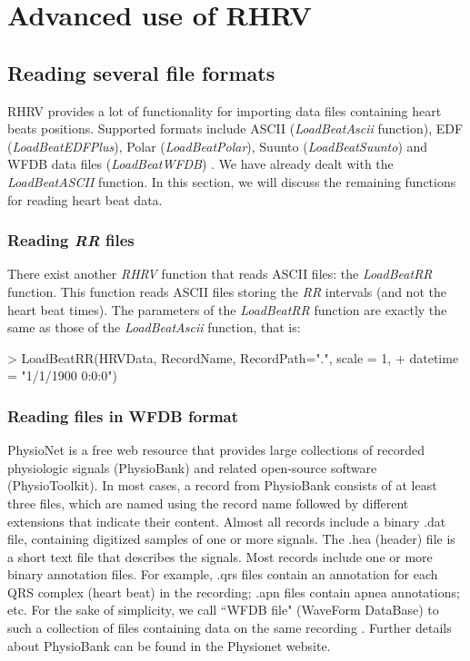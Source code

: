 \documentclass[12pt,lot, lof]{puthesis}
\begin{document}

\chapter{Advanced use of  RHRV\label{ch:RHRV}}

\section{Reading several file formats\label{sec:fileFormats}}
 RHRV provides a lot of functionality for importing data files containing heart 
beats positions. Supported formats include ASCII (\textit{LoadBeatAscii} 
function), EDF (\textit{LoadBeatEDFPlus}), Polar (\textit{LoadBeatPolar}), 
Suunto (\textit{LoadBeatSuunto}) and WFDB data files (\textit{LoadBeatWFDB}) 
\cite{mitbih}. We have already dealt with the \textit{LoadBeatASCII} function. 
In this section, we will discuss the remaining functions for reading heart beat 
data.

\subsection{Reading \textit{RR} files} There exist another \textit{RHRV} 
function that reads ASCII files:  the \textit{LoadBeatRR} function. This 
function reads ASCII files storing the \textit{RR} intervals (and not the heart 
beat times). The parameters of the \textit{LoadBeatRR} function are exactly the 
same as those of the \textit{LoadBeatAscii} function, that is:
\begin{Schunk}
\begin{Sinput}
> LoadBeatRR(HRVData, RecordName, RecordPath=".", scale = 1, 
+       datetime = "1/1/1900 0:0:0")
\end{Sinput}
\end{Schunk}
\subsection{Reading files in WFDB format} PhysioNet \cite{physioNet} is a free 
web resource that provides large collections of recorded physiologic signals 
(PhysioBank) and related open-source software (PhysioToolkit). In most cases, a 
record from PhysioBank consists of at least three files, which are named using 
the record name followed by different extensions that indicate their content. 
Almost all records include a binary .dat  file, containing digitized samples of 
one or more signals. The .hea (header) file is a short text file that describes 
the signals. Most records include one or more binary annotation files. For 
example, .qrs files contain an annotation for each QRS complex (heart beat) in 
the recording; .apn files contain apnea annotations; etc. For the sake of 
simplicity, we call ``WFDB file" (WaveForm DataBase) to such a collection of 
files containing data on the same recording \cite{mitbih}. Further details 
about PhysioBank can be found in the Physionet website. \\
\end{document}
